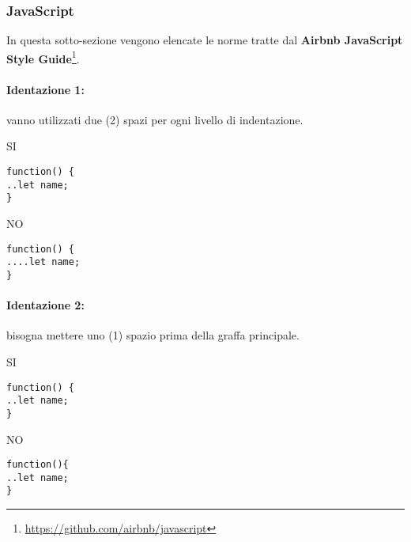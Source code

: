 \documentclass[../ProcessiPrimari.tex]{subfiles}
\begin{document}
	
	\subsubsection{JavaScript}
	In questa sotto-sezione vengono elencate le norme tratte dal \textbf{Airbnb JavaScript Style Guide}\footnote{\href{https://github.com/airbnb/javascript}{https://github.com/airbnb/javascript}}.
	
	\paragraph*{Identazione 1: }
	vanno utilizzati due (2) spazi per ogni livello di indentazione.
	
	\begin{center}{
	\begin{minipage}{4cm}
		{\begin{center}SI\end{center}}
		\begin{Verbatim}[frame=single]
function() {
..let name;
}
		\end{Verbatim}
	\end{minipage}
	\hfil
	\begin{minipage}{4cm}
		{\begin{center}NO\end{center}}
		\begin{Verbatim}[frame=single]
function() {
....let name;
}
		\end{Verbatim}
	\end{minipage}
	}
	\end{center}
	
	\paragraph*{Identazione 2: }
	bisogna mettere uno (1) spazio prima della graffa principale.	
	\begin{center}{	
	\begin{minipage}{4cm}
		{\begin{center}SI\end{center}}
		\begin{Verbatim}[frame=single]
function() {
..let name;
}
		\end{Verbatim}
	\end{minipage}
	\hfil
	\begin{minipage}{4cm}
		{\begin{center}NO\end{center}}
		\begin{Verbatim}[frame=single]
function(){
..let name;
}
		\end{Verbatim}
	\end{minipage}
	}
	\end{center}	
\end{document}

